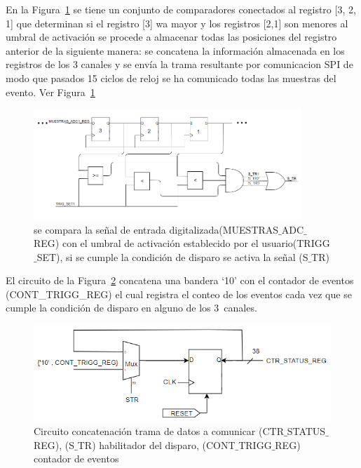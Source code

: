 En la Figura~\ref{detectorumbral} se tiene un conjunto de comparadores conectados al registro [3, 2, 1] que determinan si el registro [3] wa mayor y los registros [2,1] son menores al umbral de activación se procede a almacenar todas las posiciones del registro anterior de la siguiente manera: se concatena la información almacenada en los registros de los 3 canales y se envía la trama resultante por comunicacion SPI de modo que pasados 15 ciclos de reloj se ha comunicado todas las muestras del evento. Ver Figura~\ref{detectorumbral}
\begin{figure}[H]
\includegraphics[width=0.9\textwidth]{Figs/COMPARA.PNG} 
\centering
\caption[Circuito de umbral de activación]{se compara la señal de entrada digitalizada(MUESTRAS$\_$ADC$\_$REG) con el umbral de activación establecido por el usuario(TRIGG$\_$SET),  si se cumple la condición de disparo se activa la señal (S$\_$TR)}
\label{detectorumbral}
\end{figure}

El circuito de la Figura~\ref{eve} concatena una bandera `10' con el contador de eventos\\ 
(CONT\_TRIGG\_REG) el cual registra el conteo de  los eventos cada vez que se cumple la condición de disparo en alguno de los 3~canales. 

\begin{figure}[h!]
\includegraphics[scale=0.9]{Figs/ctr_status.PNG} 
\centering
\caption[Circuito concatenación trama de datos a comunicar protocolo SPI]{Circuito concatenación trama de datos a comunicar (CTR$\_$STATUS$\_$REG), (S$\_$TR) habilitador  del disparo, (CONT$\_$TRIGG$\_$REG) contador de eventos}
\label{eve}
\end{figure}

